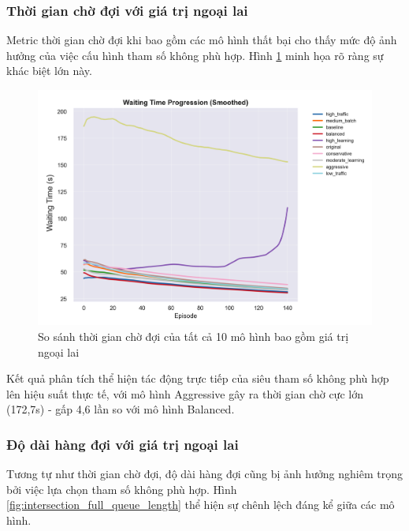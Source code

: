 \subsubsection{Thời gian chờ đợi với giá trị ngoại lai}
Metric thời gian chờ đợi khi bao gồm các mô hình thất bại cho thấy mức độ ảnh hưởng của việc cấu hình tham số không phù hợp. Hình \ref{fig:intersection_full_waiting_time} minh họa rõ ràng sự khác biệt lớn này.

\begin{figure}[!htp]
    \centering
    \includegraphics[width=\textwidth]{
        figures/individual_plots/intersection_full_waiting_time.png
    }
    \caption{So sánh thời gian chờ đợi của tất cả 10 mô hình bao gồm giá trị ngoại lai}
    \label{fig:intersection_full_waiting_time}
\end{figure}

Kết quả phân tích thể hiện tác động trực tiếp của siêu tham số không phù hợp lên hiệu suất thực tế, với mô hình Aggressive gây ra thời gian chờ cực lớn (172,7s) - gấp 4,6 lần so với mô hình Balanced.

\subsubsection{Độ dài hàng đợi với giá trị ngoại lai}
Tương tự như thời gian chờ đợi, độ dài hàng đợi cũng bị ảnh hưởng nghiêm trọng bởi việc lựa chọn tham số không phù hợp. Hình \ref{fig:intersection_full_queue_length} thể hiện sự chênh lệch đáng kể giữa các mô hình.

